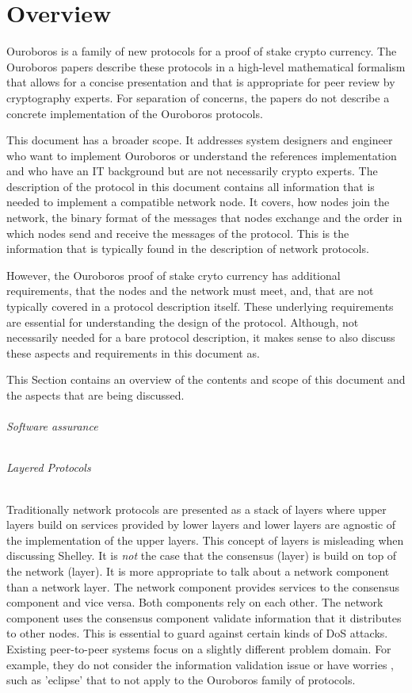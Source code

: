 \documentclass{report}
\newcommand{\wip}[1]{\color{magenta}{#1}\color{black}}
\theoremstyle{definition}{
  \newtheorem{lemma}{Lemma}[section] %
  \newtheorem{definition}[lemma]{Definition}
}
\theoremstyle{theorem}{
  \newtheorem{invariant}[lemma]{Invariant}
  \newtheorem{proofobligation}[lemma]{Proof Obligation}
}
\numberwithin{equation}{lemma}
\begin{document}
\chapter{Overview}
Ouroboros is a family of new protocols for a proof of stake crypto currency.
The Ouroboros papers describe these protocols in a high-level mathematical formalism
that allows for a concise presentation and that is appropriate for peer review by cryptography experts.
For separation of concerns, the papers do not describe a concrete implementation of the Ouroboros
protocols.

This document has a broader scope.
It addresses system designers and engineer who want to implement Ouroboros or understand
the references implementation and who have an IT background but are not necessarily crypto experts. 
The description of the protocol in this document contains
all information that is needed to implement a compatible network node.
It covers, how nodes join the network, the binary format of the messages that nodes exchange and
the order in which nodes send and receive the messages of the protocol.
This is the information that is typically found in the description of network protocols.

However, the Ouroboros proof of stake cryto currency has additional requirements,
that the nodes and the network must meet, and, that are not typically covered in a
protocol  description itself.
These underlying requirements are essential for understanding the design of the protocol.
Although, not necessarily needed for a bare protocol description,
it makes sense to also discuss these aspects and requirements in this document as.

This Section contains an overview of the contents and scope of this document and the aspects that
are being discussed.

\subparagraph{Software assurance}
\wip{Software assurance}

\subparagraph{Layered Protocols}
Traditionally network protocols are presented as a stack of layers where
upper layers build on services provided by lower layers and lower layers
are agnostic of the implementation of the upper layers.
This concept of layers is misleading when discussing Shelley.
It is {\em not} the case that the consensus (layer) is build on top of the network (layer).
It is more appropriate to talk about a network component than a network layer.
The network component provides services to the consensus component and vice versa.
Both components rely on each other.
The network component uses the consensus component validate
information that it distributes to other nodes.
This is essential to guard against certain kinds of DoS attacks.
Existing peer-to-peer systems focus on a slightly different problem domain.
For example, they do not consider the information validation issue
or have worries , such as 'eclipse' that to not
apply to the Ouroboros family of protocols.
\end{document}
